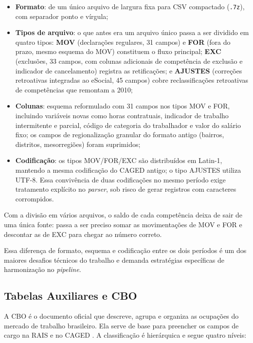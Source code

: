 \begin{itemize}
    \item \textbf{Formato}: de um único arquivo de largura fixa para CSV compactado (\texttt{.7z}), com separador ponto e vírgula;
    \item \textbf{Tipos de arquivo}: o que antes era um arquivo único passa a ser dividido em quatro tipos: \textbf{MOV} (declarações regulares, 31 campos) e \textbf{FOR} (fora do prazo, mesmo esquema do MOV) constituem o fluxo principal; \textbf{EXC} (exclusões, 33 campos, com colunas adicionais de competência de exclusão e indicador de cancelamento) registra as retificações; e \textbf{AJUSTES} (correções retroativas integradas ao eSocial, 45 campos) cobre reclassificações retroativas de competências que remontam a 2010;
    \item \textbf{Colunas}: esquema reformulado com 31 campos nos tipos MOV e FOR, incluindo variáveis novas como horas contratuais, indicador de trabalho intermitente e parcial, código de categoria do trabalhador e valor do salário fixo; os campos de
    regionalização granular do formato antigo (bairros, distritos, mesorregiões) foram
    suprimidos;
    \item \textbf{Codificação}: os tipos MOV\slash{}FOR\slash{}EXC são distribuídos em Latin-1, mantendo a mesma codificação do CAGED antigo; o tipo AJUSTES utiliza UTF-8.  Essa convivência de duas codificações no mesmo período exige tratamento explícito no  \textit{parser}, sob risco de gerar registros com caracteres corrompidos.
\end{itemize}

Com a divisão em vários arquivos, o saldo de cada competência deixa de sair de uma única fonte: passa a ser preciso somar as movimentações de MOV e FOR e descontar as de EXC para chegar ao número correto.

Essa diferença de formato, esquema e codificação entre os dois períodos é um dos maiores desafios técnicos do trabalho e demanda estratégias específicas de harmonização no \textit{pipeline}.

\subsection{Tabelas Auxiliares e CBO}

A CBO é o documento oficial que descreve, agrupa e organiza as ocupações do mercado de trabalho brasileiro. Ela serve de base para preencher os campos de cargo na RAIS e no CAGED \cite{CBO2024}. A classificação é hierárquica e segue quatro níveis:

